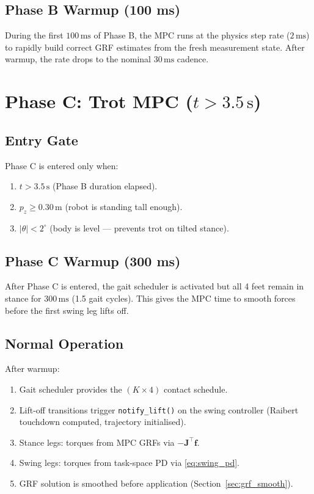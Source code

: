 \documentclass[12pt,a4paper]{report}
\newcommand{\vect}[1]{\bm{#1}}
\newcommand{\mat}[1]{\mathbf{#1}}
\begin{document}
\subsection{Phase B Warmup (100 ms)}
During the first $100\,\text{ms}$ of Phase B, the MPC runs at the physics
step rate ($2\,\text{ms}$) to rapidly build correct GRF estimates from the
fresh measurement state.  After warmup, the rate drops to the nominal
$30\,\text{ms}$ cadence.

\section{Phase C: Trot MPC ($t > 3.5\,\text{s}$)}

\subsection{Entry Gate}
Phase C is entered only when:
\begin{enumerate}[noitemsep]
  \item $t > 3.5\,\text{s}$ (Phase B duration elapsed).
  \item $p_z \geq 0.30\,\text{m}$ (robot is standing tall enough).
  \item $|\theta| < 2^\circ$ (body is level — prevents trot on tilted stance).
\end{enumerate}

\subsection{Phase C Warmup (300 ms)}
After Phase C is entered, the gait scheduler is activated but all 4 feet
remain in stance for $300\,\text{ms}$ (1.5 gait cycles).  This gives the
MPC time to smooth forces before the first swing leg lifts off.

\subsection{Normal Operation}
After warmup:
\begin{enumerate}[noitemsep]
  \item Gait scheduler provides the $(K\times4)$ contact schedule.
  \item Lift-off transitions trigger \texttt{notify\_lift()} on the swing
        controller (Raibert touchdown computed, trajectory initialised).
  \item Stance legs: torques from MPC GRFs via $-\mat{J}^\top\vect{f}$.
  \item Swing legs: torques from task-space PD via \eqref{eq:swing_pd}.
  \item GRF solution is smoothed before application (Section~\ref{sec:grf_smooth}).
\end{enumerate}
\end{document}
